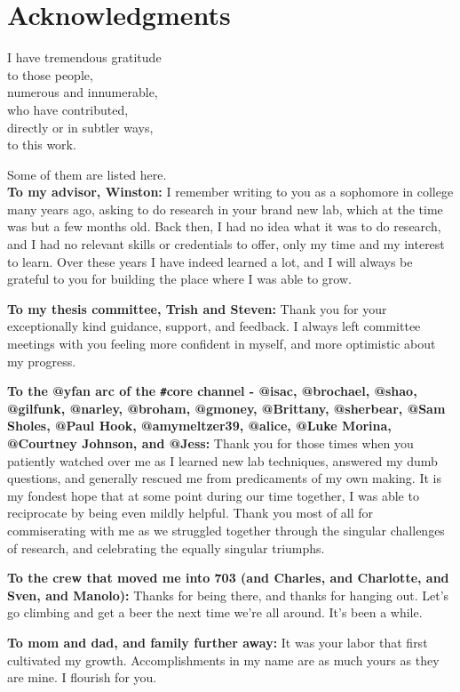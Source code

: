 \chapter*{Acknowledgments}

I have tremendous gratitude \\
to those people, \\
numerous and innumerable, \\
who have contributed, \\
directly or in subtler ways, \\
to this work.

Some of them are listed here. \\

\textbf{To my advisor, Winston:} I remember writing to you as a sophomore in college many years ago, asking to do research in your brand new lab, which at the time was but a few months old. Back then, I had no idea what it was to do research, and I had no relevant skills or credentials to offer, only my time and my interest to learn. Over these years I have indeed learned a lot, and I will always be grateful to you for building the place where I was able to grow.

\textbf{To my thesis committee, Trish and Steven:} Thank you for your exceptionally kind guidance, support, and feedback. I always left committee meetings with you feeling more confident in myself, and more optimistic about my progress.

\textbf{To the @yfan arc of the \texttt{\#}core channel - @isac, @brochael, @shao, @gilfunk, @narley, @broham, @gmoney, @Brittany, @sherbear, @Sam Sholes, @Paul Hook, @amymeltzer39, @alice, @Luke Morina, @Courtney Johnson, and @Jess:} Thank you for those times when you patiently watched over me as I learned new lab techniques, answered my dumb questions, and generally rescued me from predicaments of my own making. It is my fondest hope that at some point during our time together, I was able to reciprocate by being even mildly helpful. Thank you most of all for commiserating with me as we struggled together through the singular challenges of research, and celebrating the equally singular triumphs.

\textbf{To the crew that moved me into 703 (and Charles, and Charlotte, and Sven, and Manolo):} Thanks for being there, and thanks for hanging out. Let's go climbing and get a beer the next time we're all around. It's been a while.

\textbf{To mom and dad, and family further away:} It was your labor that first cultivated my growth. Accomplishments in my name are as much yours as they are mine. I flourish for you.
